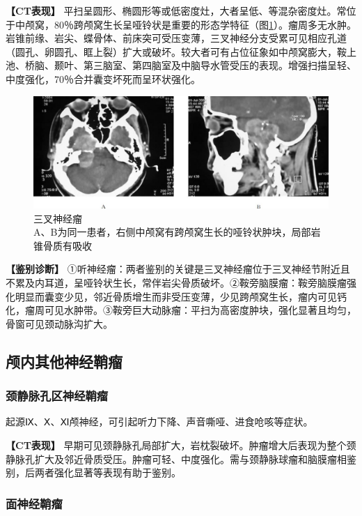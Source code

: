 \textbf{【CT表现】}
平扫呈圆形、椭圆形等或低密度灶，大者呈低、等混杂密度灶。常位于中颅窝，80％跨颅窝生长呈哑铃状是重要的形态学特征（图\ref{fig2-49}）。瘤周多无水肿。岩锥前缘、岩尖、蝶骨体、前床突可受压变薄，三叉神经分支受累可见相应孔道（圆孔、卵圆孔、眶上裂）扩大或破坏。较大者可有占位征象如中颅窝膨大，鞍上池、桥脑、颞叶、第三脑室、第四脑室及中脑导水管受压的表现。增强扫描呈轻、中度强化，70％合并囊变坏死而呈环状强化。

\begin{figure}[!htbp]
 \centering
 \includegraphics[width=.7\textwidth,height=\textheight,keepaspectratio]{./images/Image00080.jpg}
 \captionsetup{justification=centering}
 \caption{三叉神经瘤\\{\small A、B为同一患者，右侧中颅窝有跨颅窝生长的哑铃状肿块，局部岩锥骨质有吸收}}
 \label{fig2-49}
  \end{figure} 

\textbf{【鉴别诊断】}
①听神经瘤：两者鉴别的关键是三叉神经瘤位于三叉神经节附近且不累及内耳道，呈哑铃状生长，常伴岩尖骨质破坏。②鞍旁脑膜瘤：鞍旁脑膜瘤强化明显而囊变少见，邻近骨质增生而非受压变薄，少见跨颅窝生长，瘤内可见钙化，瘤周可见水肿带。③鞍旁巨大动脉瘤：平扫为高密度肿块，强化显著且均匀，骨窗可见颈动脉沟扩大。

\subsection{颅内其他神经鞘瘤}

\subsubsection{颈静脉孔区神经鞘瘤}

起源Ⅸ、Ⅹ、Ⅺ颅神经，可引起听力下降、声音嘶哑、进食呛咳等症状。

\textbf{【CT表现】}
早期可见颈静脉孔局部扩大，岩枕裂破坏。肿瘤增大后表现为整个颈静脉孔扩大及邻近骨质受压。肿瘤可轻、中度强化。需与颈静脉球瘤和脑膜瘤相鉴别，后两者强化显著等表现有助于鉴别。

\subsubsection{面神经鞘瘤}

